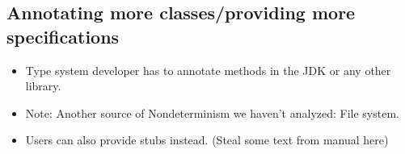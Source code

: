 \subsection{Annotating more classes/providing more specifications}
\begin{itemize}
    \item Type system developer has to annotate methods in the JDK or any other library.
    \item Note: Another source of Nondeterminism we haven't analyzed: File system.
    \item Users can also provide stubs instead. (Steal some text from manual here)
\end{itemize}
